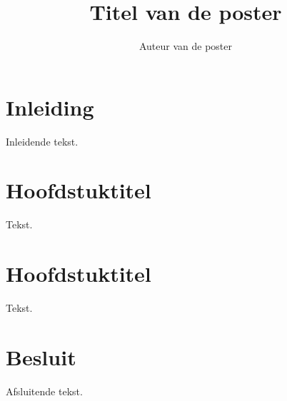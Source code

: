 \documentclass{kulakposter}
\title{Titel van de poster} %
\author{Auteur van de poster} %
\institute{Onderzoeksgroep} %
\begin{document}
\maketitle

\section*{Inleiding}
\begin{multicols}{2}\setlength{\columnseprule}{0pt}
Inleidende tekst.
\end{multicols}

\begin{multicols}{2}
\section{Hoofdstuktitel}
Tekst. \photohere

\columnbreak
\section{Hoofdstuktitel}
Tekst.
\end{multicols}

\section*{Besluit}
\begin{multicols}{2}\setlength{\columnseprule}{0pt}
Afsluitende tekst.
\end{multicols}
\end{document}

